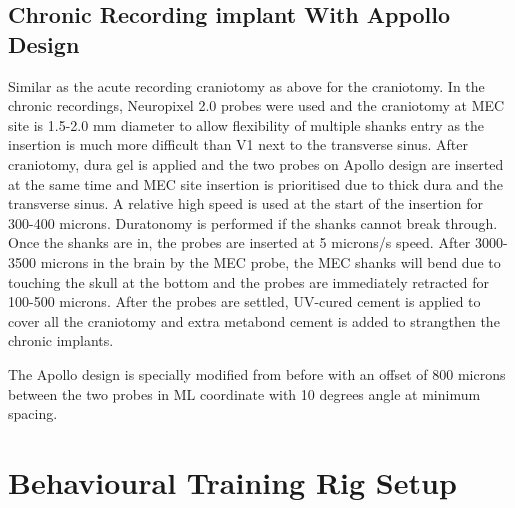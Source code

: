 \subsection{Chronic Recording implant With Appollo Design}
Similar as the acute recording craniotomy as above for the craniotomy. In the chronic recordings, Neuropixel 2.0 probes were used and the craniotomy at MEC site is 1.5-2.0 mm diameter to allow flexibility of  multiple shanks entry as the insertion is much more difficult than V1 next to the transverse sinus. After craniotomy, dura gel is applied and the two probes on Apollo design are inserted at the same time and MEC site insertion is prioritised due to thick dura and the transverse sinus. A relative high speed is used at the start of the insertion for 300-400 microns. Duratonomy is performed if the shanks cannot break through. Once the shanks are in, the probes are inserted at 5 microns/s speed. After 3000-3500 microns in the brain by the MEC probe, the MEC shanks will bend due to touching the skull at the bottom and the probes are immediately retracted for 100-500 microns. After the probes are settled, UV-cured cement is applied to cover all the craniotomy and extra metabond cement is added to strangthen the chronic implants.

The Apollo design is specially modified from before with an offset of 800 microns between the two probes in ML coordinate with 10 degrees angle at minimum spacing.

\section{Behavioural Training Rig Setup}
